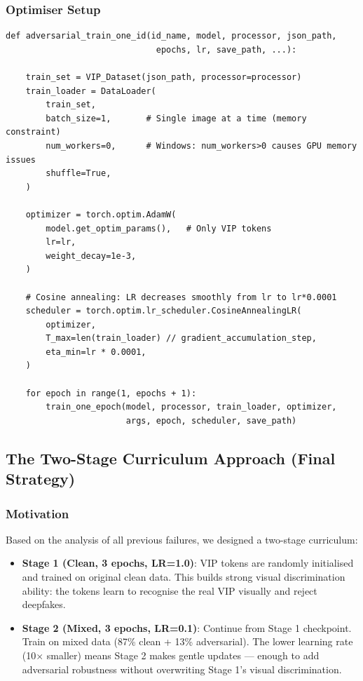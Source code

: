 \documentclass[12pt,a4paper]{article}
\begin{document}
\subsubsection{Optimiser Setup}

\begin{lstlisting}[caption={Optimiser and scheduler configuration}]
def adversarial_train_one_id(id_name, model, processor, json_path,
                              epochs, lr, save_path, ...):

    train_set = VIP_Dataset(json_path, processor=processor)
    train_loader = DataLoader(
        train_set,
        batch_size=1,       # Single image at a time (memory constraint)
        num_workers=0,      # Windows: num_workers>0 causes GPU memory issues
        shuffle=True,
    )

    optimizer = torch.optim.AdamW(
        model.get_optim_params(),   # Only VIP tokens
        lr=lr,
        weight_decay=1e-3,
    )

    # Cosine annealing: LR decreases smoothly from lr to lr*0.0001
    scheduler = torch.optim.lr_scheduler.CosineAnnealingLR(
        optimizer,
        T_max=len(train_loader) // gradient_accumulation_step,
        eta_min=lr * 0.0001,
    )

    for epoch in range(1, epochs + 1):
        train_one_epoch(model, processor, train_loader, optimizer,
                        args, epoch, scheduler, save_path)
\end{lstlisting}

\subsection{The Two-Stage Curriculum Approach (Final Strategy)}

\subsubsection{Motivation}

Based on the analysis of all previous failures, we designed a two-stage curriculum:

\begin{itemize}
    \item \textbf{Stage 1 (Clean, 3 epochs, LR=1.0)}: VIP tokens are randomly initialised and trained on original clean data. This builds strong visual discrimination ability: the tokens learn to recognise the real VIP visually and reject deepfakes.
    \item \textbf{Stage 2 (Mixed, 3 epochs, LR=0.1)}: Continue from Stage 1 checkpoint. Train on mixed data (87\% clean + 13\% adversarial). The lower learning rate (10$\times$ smaller) means Stage 2 makes gentle updates --- enough to add adversarial robustness without overwriting Stage 1's visual discrimination.
\end{itemize}
\end{document}
